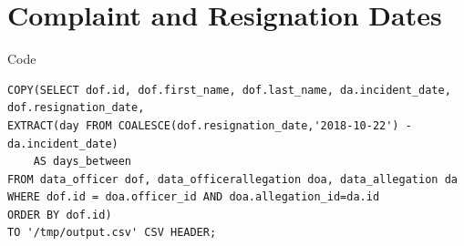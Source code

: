 \documentclass{article}
\begin{document}
\FloatBarrier
\section{Complaint and Resignation Dates}

\begin{center}
Code
\end{center} 
\begin{lstlisting}[frame=single]
COPY(SELECT dof.id, dof.first_name, dof.last_name, da.incident_date, 
dof.resignation_date, 
EXTRACT(day FROM COALESCE(dof.resignation_date,'2018-10-22') - da.incident_date) 
	AS days_between
FROM data_officer dof, data_officerallegation doa, data_allegation da
WHERE dof.id = doa.officer_id AND doa.allegation_id=da.id
ORDER BY dof.id)
TO '/tmp/output.csv' CSV HEADER;
\end{lstlisting}
\end{document}
